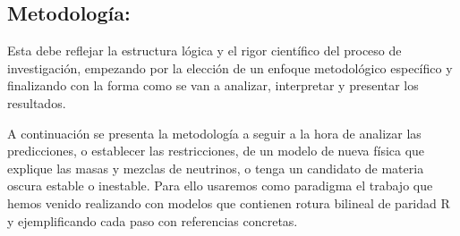 \subsection{Metodología:                                   }
\begin{instrucciones}
  Esta debe reflejar la estructura lógica y el rigor científico del
  proceso de investigación, empezando por la elección de un enfoque
  metodológico específico y finalizando con la forma como se van a
  analizar, interpretar y presentar los resultados.
\end{instrucciones}

A continuación se presenta la metodología a seguir a la hora de
analizar las predicciones, o establecer las restricciones, de un
modelo de nueva física que explique las masas y mezclas de neutrinos,
o tenga un candidato de materia oscura estable o inestable. Para
ello usaremos como paradigma el trabajo que hemos venido realizando
con modelos que contienen rotura bilineal de paridad R y ejemplificando cada
paso con referencias concretas.
